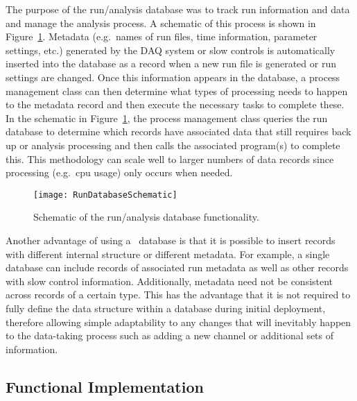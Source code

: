 	The purpose of the run/analysis database was to track run information and
data and manage the analysis process.  A schematic of this process is shown in
Figure~\ref{fig:RunDBSchem}.  Metadata (e.g.~names of run files, time
information, parameter settings, etc.) generated by the DAQ system or slow
controls is automatically inserted into the database as a record when a new run
file is generated or run settings are changed.  Once this information appears
in the database, a process management class can then determine what types of
processing needs to happen to the metadata record and then execute the
necessary tasks to complete these.  In the schematic in
Figure~\ref{fig:RunDBSchem}, the process management class queries the run
database to determine which records have associated data that still requires
back up or analysis processing and then calls the associated program(s) to
complete this.  This methodology can scale well to larger numbers of data
records since processing (e.g.~cpu usage) only occurs when needed.  

			\begin{figure}
				\centering
				\texttt{[image: RunDatabaseSchematic]}
				\caption[Schematic of the run/analysis database functionality.]
				{Schematic of the run/analysis database functionality.}
				\label{fig:RunDBSchem}
			\end{figure}	

	Another advantage of using a \couchdb~database is that it is possible to insert records with different internal structure or different
metadata.  For example, a single database can include records of associated run metadata as well as other records with slow control information.  Additionally, metadata need not be consistent across records of a certain type.  This has the advantage that it is not required to fully define the data structure within a database during initial deployment, therefore allowing simple adaptability to any changes that will inevitably happen to the data-taking process such as adding a new channel or additional sets of information.  

		\subsection{Functional Implementation}
			\lstset{
		   language=JSON,
		   extendedchars=true,
		   basicstyle=\footnotesize\ttfamily,
		   showstringspaces=false,
		   showspaces=false,
		   numbers=left,
		   numberstyle=\footnotesize,
		   numbersep=9pt,
		   tabsize=2,
		   breaklines=true,
		   showtabs=false,
		   captionpos=b}	

